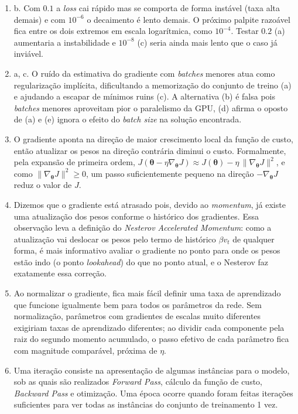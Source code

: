 \documentclass{dlproblemset}
\begin{document}
\begin{enumerate}[1)]
    \item b. Com $0.1$ a \textit{loss} cai rápido mas se comporta de forma instável (taxa alta demais) e com $10^{-6}$ o decaimento é lento demais. O próximo palpite razoável fica entre os dois extremos em escala logarítmica, como $10^{-4}$. Testar $0.2$ (a) aumentaria a instabilidade e $10^{-8}$ (c) seria ainda mais lento que o caso já inviável.

    \item a, c. O ruído da estimativa do gradiente com \textit{batches} menores atua como regularização implícita, dificultando a memorização do conjunto de treino (a) e ajudando a escapar de mínimos ruins (c). A alternativa (b) é falsa pois \textit{batches} menores aproveitam pior o paralelismo da GPU, (d) afirma o oposto de (a) e (e) ignora o efeito do \textit{batch size} na solução encontrada.

    \item O gradiente aponta na direção de maior crescimento local da função de custo, então atualizar os pesos na direção contrária diminui o custo. Formalmente, pela expansão de primeira ordem, $J(\boldsymbol{\theta} - \eta\nabla_{\boldsymbol{\theta}} J) \approx J(\boldsymbol{\theta}) - \eta\,\|\nabla_{\boldsymbol{\theta}} J\|^2$, e como $\|\nabla_{\boldsymbol{\theta}} J\|^2 \geq 0$, um passo suficientemente pequeno na direção $-\nabla_{\boldsymbol{\theta}} J$ reduz o valor de $J$.

    \item Dizemos que o gradiente está atrasado pois, devido ao \textit{momentum}, já existe uma atualização dos pesos conforme o histórico dos gradientes. Essa observação leva a definição do \textit{Nesterov Accelerated Momentum}: como a atualização vai deslocar os pesos pelo termo de histórico $\beta v_t$ de qualquer forma, é mais informativo avaliar o gradiente no ponto para onde os pesos estão indo (o ponto \textit{lookahead}) do que no ponto atual, e o Nesterov faz exatamente essa correção.

    \item Ao normalizar o gradiente, fica mais fácil definir uma taxa de aprendizado que funcione igualmente bem para todos os parâmetros da rede. Sem normalização, parâmetros com gradientes de escalas muito diferentes exigiriam taxas de aprendizado diferentes; ao dividir cada componente pela raiz do segundo momento acumulado, o passo efetivo de cada parâmetro fica com magnitude comparável, próxima de $\eta$.

    \item Uma iteração consiste na apresentação de algumas instâncias para o modelo, sob as quais são realizados \textit{Forward Pass}, cálculo da função de custo, \textit{Backward Pass} e otimização. Uma época ocorre quando foram feitas iterações suficientes para ver todas as instâncias do conjunto de treinamento 1 vez.


\end{enumerate}
\end{document}
